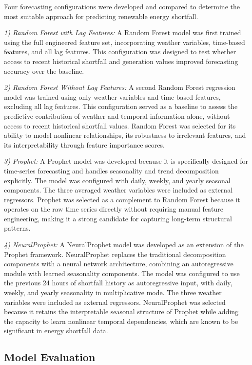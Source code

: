 \documentclass[conference]{IEEEtran}
\begin{document}
Four forecasting configurations were developed and compared to determine the most suitable approach for predicting renewable energy shortfall.
 
\textit{1) Random Forest with Lag Features:} A Random Forest model was first trained using the full engineered feature set, incorporating weather variables, time-based features, and all lag features. This configuration was designed to test whether access to recent historical shortfall and generation values improved forecasting accuracy over the baseline.
 
\textit{2) Random Forest Without Lag Features:} A second Random Forest regression model was trained using only weather variables and time-based features, excluding all lag features. This configuration served as a baseline to assess the predictive contribution of weather and temporal information alone, without access to recent historical shortfall values. Random Forest was selected for its ability to model nonlinear relationships, its robustness to irrelevant features, and its interpretability through feature importance scores.
 
\textit{3) Prophet:} A Prophet model was developed because it is specifically designed for time-series forecasting and handles seasonality and trend decomposition explicitly. The model was configured with daily, weekly, and yearly seasonal components. The three averaged weather variables were included as external regressors. Prophet was selected as a complement to Random Forest because it operates on the raw time series directly without requiring manual feature engineering, making it a strong candidate for capturing long-term structural patterns.
 
\textit{4) NeuralProphet:} A NeuralProphet model was developed as an extension of the Prophet framework. NeuralProphet replaces the traditional decomposition components with a neural network architecture, combining an autoregressive module with learned seasonality components. The model was configured to use the previous 24 hours of shortfall history as autoregressive input, with daily, weekly, and yearly seasonality in multiplicative mode. The three weather variables were included as external regressors. NeuralProphet was selected because it retains the interpretable seasonal structure of Prophet while adding the capacity to learn nonlinear temporal dependencies, which are known to be significant in energy shortfall data.
 
\subsection{Model Evaluation}
 
\end{document}
